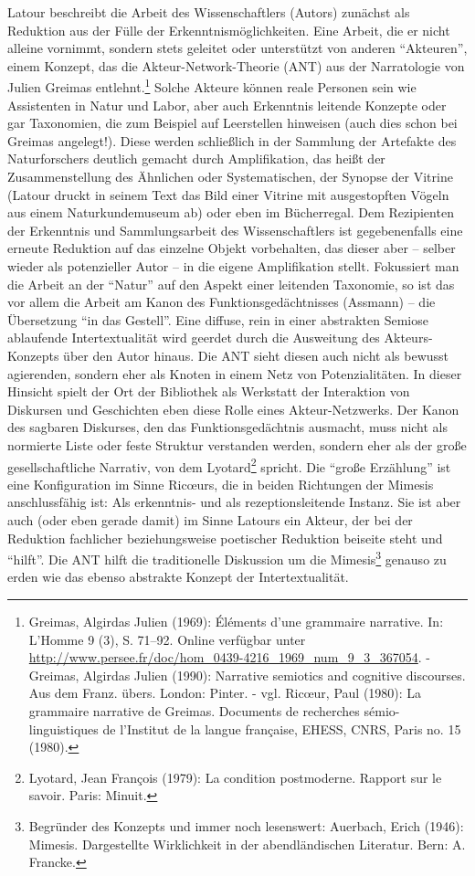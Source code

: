 Latour beschreibt die Arbeit des Wissenschaftlers (Autors) zunächst als
Reduktion aus der Fülle der Erkenntnismöglichkeiten. Eine Arbeit, die er
nicht alleine vornimmt, sondern stets geleitet oder unterstützt von
anderen \enquote{Akteuren}, einem Konzept, das die
Akteur-Network-Theorie (ANT) aus der Narratologie von Julien Greimas
entlehnt.\footnote{Greimas, Algirdas Julien (1969): Éléments d'une
  grammaire narrative. In: L'Homme 9 (3), S. 71--92. Online verfügbar
  unter
  \url{http://www.persee.fr/doc/hom_0439-4216_1969_num_9_3_367054}. -
  Greimas, Algirdas Julien (1990): Narrative semiotics and cognitive
  discourses. Aus dem Franz. übers. London: Pinter. - vgl. Ricœur, Paul
  (1980): La grammaire narrative de Greimas. Documents de recherches
  sémio-linguistiques de l'Institut de la langue française, EHESS, CNRS,
  Paris no. 15 (1980).} Solche Akteure können reale Personen sein wie
Assistenten in Natur und Labor, aber auch Erkenntnis leitende Konzepte
oder gar Taxonomien, die zum Beispiel auf Leerstellen hinweisen (auch
dies schon bei Greimas angelegt!). Diese werden schließlich in der
Sammlung der Artefakte des Naturforschers deutlich gemacht durch
Amplifikation, das heißt der Zusammenstellung des Ähnlichen oder
Systematischen, der Synopse der Vitrine (Latour druckt in seinem Text
das Bild einer Vitrine mit ausgestopften Vögeln aus einem
Naturkundemuseum ab) oder eben im Bücherregal. Dem Rezipienten der
Erkenntnis und Sammlungsarbeit des Wissenschaftlers ist gegebenenfalls
eine erneute Reduktion auf das einzelne Objekt vorbehalten, das dieser
aber -- selber wieder als potenzieller Autor -- in die eigene
Amplifikation stellt. Fokussiert man die Arbeit an der \enquote{Natur}
auf den Aspekt einer leitenden Taxonomie, so ist das vor allem die
Arbeit am Kanon des Funktionsgedächtnisses (Assmann) -- die Übersetzung
\enquote{in das Gestell}. Eine diffuse, rein in einer abstrakten Semiose
ablaufende Intertextualität wird geerdet durch die Ausweitung des
Akteurs-Konzepts über den Autor hinaus. Die ANT sieht diesen auch nicht
als bewusst agierenden, sondern eher als Knoten in einem Netz von
Potenzialitäten. In dieser Hinsicht spielt der Ort der Bibliothek als
Werkstatt der Interaktion von Diskursen und Geschichten eben diese Rolle
eines Akteur-Netzwerks. Der Kanon des sagbaren Diskurses, den das
Funktionsgedächtnis ausmacht, muss nicht als normierte Liste oder feste
Struktur verstanden werden, sondern eher als der große gesellschaftliche
Narrativ, von dem Lyotard\footnote{Lyotard, Jean François (1979): La
  condition postmoderne. Rapport sur le savoir. Paris: Minuit.} spricht.
Die \enquote{große Erzählung} ist eine Konfiguration im Sinne Ricœurs,
die in beiden Richtungen der Mimesis anschlussfähig ist: Als erkenntnis-
und als rezeptionsleitende Instanz. Sie ist aber auch (oder eben gerade
damit) im Sinne Latours ein Akteur, der bei der Reduktion fachlicher
beziehungsweise poetischer Reduktion beiseite steht und \enquote{hilft}.
Die ANT hilft die traditionelle Diskussion um die Mimesis\footnote{Begründer
  des Konzepts und immer noch lesenswert: Auerbach, Erich (1946):
  Mimesis. Dargestellte Wirklichkeit in der abendländischen Literatur.
  Bern: A. Francke.} genauso zu erden wie das ebenso abstrakte Konzept
der Intertextualität.

